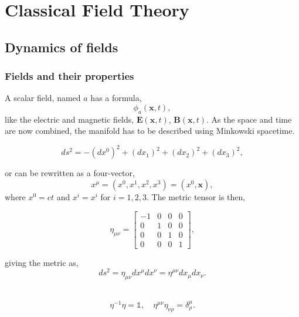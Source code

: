 \chapter{Classical Field Theory}
\section{Dynamics of fields}
\subsection{Fields and their properties}
A scalar field, named $a$ has a formula, 
\begin{equation}
  \phi_a(\mathbf{x}, t),
\end{equation}
like the electric and magnetic fields, $\mathbf{E}(\mathbf{x}, t)$, $\mathbf{B}(\mathbf{x}, t)$. As the space and time are now combined, the manifold has to be described using Minkowski spacetime.
\begin{definition}[Metric]
  \begin{equation}
    ds^2 = -(dx^0)^2 + (dx_1)^2 + (dx_2)^2 + (dx_3)^2,
  \end{equation}
  \vspace{-0.5cm}
\end{definition}

or can be rewritten as a four-vector,
\begin{equation}
  x^\mu = (x^0, x^1, x^2, x^3) = (x^0, \mathbf{x}),
\end{equation}
where $x^0 = ct$ and $x^i = x^i$ for $i = 1, 2, 3$. The metric tensor is then,
\begin{definition}
\begin{equation}
  \eta_{\mu\nu} = \begin{bmatrix}
    -1 & 0 & 0 & 0 \\
    0 & 1 & 0 & 0 \\
    0 & 0 & 1 & 0 \\
    0 & 0 & 0 & 1 
  \end{bmatrix}, 
\end{equation}
\vspace{-0.5cm}
\end{definition}
giving the metric as, 
\begin{equation}
  ds^2 = \eta_{\mu\nu}dx^\mu dx^\nu = \eta^{\mu\nu}dx_\mu dx_\nu. 
\end{equation}\\

\begin{Note}
  \begin{equation}
    \eta^{-1}\eta = \mathds{1},\quad \eta^{\mu\nu}\eta_{\nu\rho} = \delta^\mu_\rho.
  \end{equation}
\end{Note}\vspace{0.5cm}

